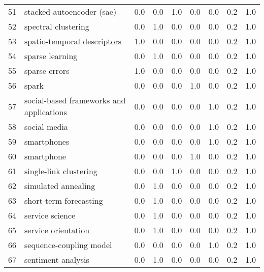 \begin{tabular}{llrrrrrrr}
51 &                       stacked autoencoder (sae) &   0.0 &   0.0 &   1.0 &   0.0 &   0.0 &   0.2 &    1.0 \\
52 &                             spectral clustering &   0.0 &   1.0 &   0.0 &   0.0 &   0.0 &   0.2 &    1.0 \\
53 &                     spatio-temporal descriptors &   1.0 &   0.0 &   0.0 &   0.0 &   0.0 &   0.2 &    1.0 \\
54 &                                 sparse learning &   0.0 &   1.0 &   0.0 &   0.0 &   0.0 &   0.2 &    1.0 \\
55 &                                   sparse errors &   1.0 &   0.0 &   0.0 &   0.0 &   0.0 &   0.2 &    1.0 \\
56 &                                           spark &   0.0 &   0.0 &   0.0 &   1.0 &   0.0 &   0.2 &    1.0 \\
57 &        social-based frameworks and applications &   0.0 &   0.0 &   0.0 &   0.0 &   1.0 &   0.2 &    1.0 \\
58 &                                    social media &   0.0 &   0.0 &   0.0 &   0.0 &   1.0 &   0.2 &    1.0 \\
59 &                                     smartphones &   0.0 &   0.0 &   0.0 &   0.0 &   1.0 &   0.2 &    1.0 \\
60 &                                      smartphone &   0.0 &   0.0 &   0.0 &   1.0 &   0.0 &   0.2 &    1.0 \\
61 &                          single-link clustering &   0.0 &   0.0 &   1.0 &   0.0 &   0.0 &   0.2 &    1.0 \\
62 &                             simulated annealing &   0.0 &   1.0 &   0.0 &   0.0 &   0.0 &   0.2 &    1.0 \\
63 &                          short-term forecasting &   0.0 &   1.0 &   0.0 &   0.0 &   0.0 &   0.2 &    1.0 \\
64 &                                 service science &   0.0 &   1.0 &   0.0 &   0.0 &   0.0 &   0.2 &    1.0 \\
65 &                             service orientation &   0.0 &   1.0 &   0.0 &   0.0 &   0.0 &   0.2 &    1.0 \\
66 &                         sequence-coupling model &   0.0 &   0.0 &   0.0 &   0.0 &   1.0 &   0.2 &    1.0 \\
67 &                              sentiment analysis &   0.0 &   1.0 &   0.0 &   0.0 &   0.0 &   0.2 &    1.0 \\

\end{tabular}
